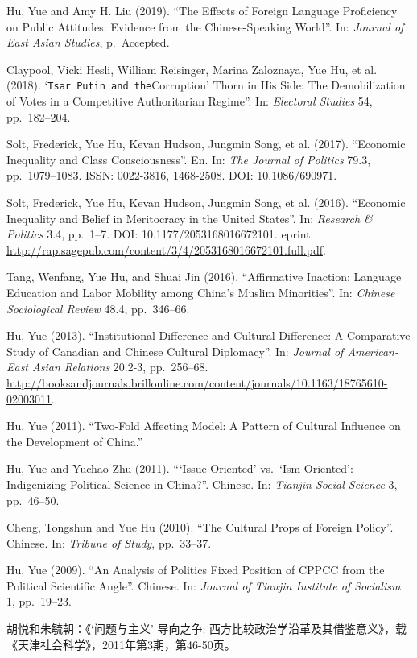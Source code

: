\documentclass[10.5pt,]{article}
\begin{document}
Hu, Yue and Amy H. Liu (2019). ``The Effects of Foreign Language
Proficiency on Public Attitudes: Evidence from the Chinese-Speaking
World''. In: \emph{Journal of East Asian Studies}, p.~Accepted.

Claypool, Vicki Hesli, William Reisinger, Marina Zaloznaya, Yue Hu, et
al. (2018). `\texttt{Tsar\ Putin\ and\ the}Corruption' Thorn in His
Side: The Demobilization of Votes in a Competitive Authoritarian
Regime''. In: \emph{Electoral Studies} 54, pp.~182--204.

Solt, Frederick, Yue Hu, Kevan Hudson, Jungmin Song, et al. (2017).
``Economic Inequality and Class Consciousness''. En. In:
\emph{The Journal of Politics} 79.3, pp.~1079--1083. ISSN: 0022-3816,
1468-2508. DOI: 10.1086/690971.

Solt, Frederick, Yue Hu, Kevan Hudson, Jungmin Song, et al. (2016).
``Economic Inequality and Belief in Meritocracy in the United States''.
In: \emph{Research \& Politics} 3.4, pp.~1--7. DOI:
10.1177/2053168016672101. eprint:
\url{http://rap.sagepub.com/content/3/4/2053168016672101.full.pdf}.

Tang, Wenfang, Yue Hu, and Shuai Jin (2016). ``Affirmative Inaction:
Language Education and Labor Mobility among China's Muslim Minorities''.
In: \emph{Chinese Sociological Review} 48.4, pp.~346--66.

Hu, Yue (2013). ``Institutional Difference and Cultural Difference: A
Comparative Study of Canadian and Chinese Cultural Diplomacy''. In:
\emph{Journal of American-East Asian Relations} 20.2-3, pp.~256--68.
\url{http://booksandjournals.brillonline.com/content/journals/10.1163/18765610-02003011}.

Hu, Yue (2011). ``Two-Fold Affecting Model: A Pattern of Cultural
Influence on the Development of China.''

Hu, Yue and Yuchao Zhu (2011). ```Issue-Oriented' vs.~`Ism-Oriented':
Indigenizing Political Science in China?''. Chinese. In:
\emph{Tianjin Social Science} 3, pp.~46--50.

Cheng, Tongshun and Yue Hu (2010). ``The Cultural Props of Foreign
Policy''. Chinese. In: \emph{Tribune of Study}, pp.~33--37.

Hu, Yue (2009). ``An Analysis of Politics Fixed Position of CPPCC from
the Political Scientific Angle''. Chinese. In:
\emph{Journal of Tianjin Institute of Socialism} 1, pp.~19--23.

胡悦和朱毓朝：《`问题与主义' 导向之争:
西方比较政治学沿革及其借鉴意义》，载《天津社会科学》，2011年第3期，第46-50页。
\end{document}
